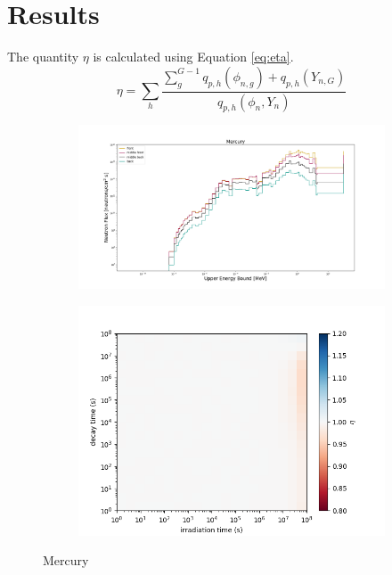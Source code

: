 \section{Results}
The quantity $\eta$ is calculated using Equation \ref{eq:eta}. 
\begin{equation}\label{eq:eta}
    \eta= \sum_{h} \frac{\sum\limits_{g}^{G-1} q_{p,h}(\phi_{n,g}) + 
    q_{p,h} (Y_{n,G})}
    {q_{p,h}( \phi_{n}, Y_{n})}
\end{equation}


\begin{figure}[!ht]
    \begin{subfigure}{0.5\textwidth}
        \includegraphics[scale=0.23, trim={4cm 1cm 4cm 2cm},clip]{figs/mer_flux.png}
    \end{subfigure}
    \begin{subfigure}{0.5\textwidth}
        \centering
        \includegraphics[scale=0.45, trim={0cm 0cm 2cm 0cm},clip]{figs/mer_front.png}
    \end{subfigure}
    \caption{Mercury}
    \label{fig:1spec_8v}
\end{figure}

